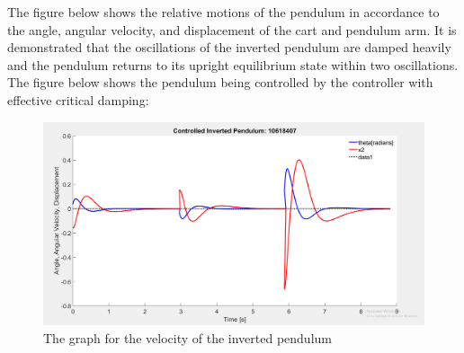 \documentclass[11pt]{report}
\begin{document}
The figure below shows the relative motions of the pendulum in accordance to the angle, angular velocity, and displacement of the cart and pendulum arm. It is demonstrated that the oscillations of the inverted pendulum are damped heavily and the pendulum returns to its upright equilibrium state within two oscillations. The figure below shows the pendulum being controlled by the controller with effective critical damping:

\begin{figure}[H]
\centerline{\includegraphics[width=12cm]{graphOfInvertedPendulum.png}}
\caption{The graph for the velocity of the inverted pendulum}
\label{fig}
\end{figure}
\end{document}
